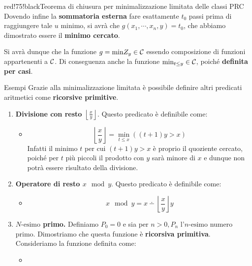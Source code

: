\begin{halfframedbox} {red!75!black}{Teorema di chiusura per minimalizzazione limitata delle classi PRC}
  Dovendo infine la \textbf{sommatoria esterna} fare esattamente \(t_0\) passi prima di raggiungere tale \(u\) minimo, si avrà che \(g(x_1,\cdots,x_n,y)=t_0\), che abbiamo dimostrato essere il \textbf{minimo cercato}.

  Si avrà dunque che la funzione \(g=\text{min} Z_y\in\mathcal{C}\) essendo composizione di funzioni appartenenti a \(\mathcal{C}\). Di conseguenza anche la funzione \(\min_{t\leq y}\in\mathcal{C}\), poiché \textbf{definita per casi}.
\end{halfframedbox}

\begin{generalbox}[colframe=azure-gradient-3!90!black]{Esempi}
  Grazie alla minimalizzazione limitata è possibile definire altri predicati aritmetici come \textbf{ricorsive primitive}.
  \begin{enumerate}
    \item \textbf{Divisione con resto \(\left\lfloor \frac{x}{y} \right\rfloor\)}. Questo predicato è definibile come:
    \begin{itemize}
      \item []
      \begin{equation}
        \left\lfloor \frac{x}{y} \right\rfloor = \min_{t\leq x} ((t+1)y > x)
      \end{equation}
      Infatti il minimo \(t\) per cui \((t+1)y > x\) è proprio il quoziente cercato, poiché per \(t\) più piccoli il prodotto con \(y\) sarà minore di \(x\) e dunque non potrà essere risultato della divisione.
    \end{itemize}
    \item \textbf{Operatore di resto \(x \mod y\)}. Questo predicato è definibile come:
    \begin{itemize}
      \item []
      \begin{equation}
        x \mod y = x \dotminus \left\lfloor \frac{x}{y} \right\rfloor y
      \end{equation}
    \end{itemize}
    \item \textbf{\(N\text{-esimo}\) primo.} Definiamo \(P_0=0\) e sia per \(n>0, P_n\) l'\(n\text{-esimo}\) numero primo. Dimostriamo che questa funzione è \textbf{ricorsiva primitiva}.
    Consideriamo la funzione definita come:
    \begin{itemize}
     \item []
     \begin{equation}\label{Definizione Ricorsiva Primitiva N-esimo Primo}

\end{equation}
\end{itemize}
\end{enumerate}
\end{generalbox}
